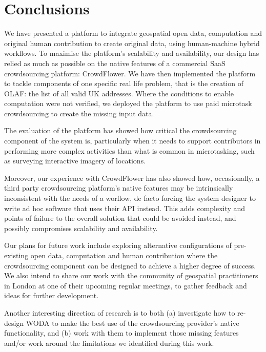 \section{Conclusions}

We have presented a platform to integrate geospatial open data, computation and original human contribution to create original data, using human-machine hybrid workflows. To maximise the platform's scalability and availability, our design has relied as much as possible on the native features of a commercial SaaS crowdsourcing platform: CrowdFlower. We have then implemented the platform to tackle components of one specific real life problem, that is the creation of OLAF: the list of all valid UK addresses. Where the conditions to enable computation were not verified, we deployed the platform to use paid microtask crowdsourcing to create the missing input data.

The evaluation of the platform has showed how critical the crowdsourcing component of the system is, particularly when it needs to support contributors in performing more complex activities than what is common in microtasking, such as surveying interactive imagery of locations. 

Moreover, our experience with CrowdFlower has also showed how, occasionally, a third party crowdsourcing platform's native features may be intrinsically inconsistent with the needs of a worflow, de facto forcing the system designer to write ad hoc software that uses their API instead. This adds complexity and points of failure to the overall solution that could be avoided instead, and possibly compromises scalability and availability. 

Our plans for future work include exploring alternative configurations of pre-existing open data, computation and human contribution where the crowdsourcing component can be designed to achieve a higher degree of success. We also intend to share our work with the community of geospatial practitioners in London at one of their upcoming regular meetings, to gather feedback and ideas for further development.

Another interesting direction of research is to both (a) investigate how to re-design WODA to make the best use of the crowdsourcing provider's native functionality, and (b) work with them to implement those missing features and/or work around the limitations we identified during this work.

